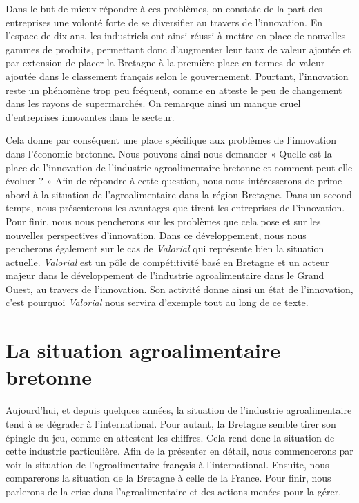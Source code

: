 \documentclass[a4paper,12pt]{report}
\begin{document}
	 Dans le but de mieux répondre à ces problèmes, on constate de la part des entreprises une volonté forte de se diversifier au travers de l’innovation. En l’espace de dix ans, les industriels ont ainsi réussi à mettre en place de nouvelles gammes de produits, permettant donc d’augmenter leur taux de valeur ajoutée et par extension de placer la Bretagne à la première place en termes de valeur ajoutée dans le classement français selon le gouvernement. Pourtant, l'innovation reste un phénomène trop peu fréquent, comme en atteste le peu de changement dans les rayons de supermarchés. On remarque ainsi un manque cruel d'entreprises innovantes dans le secteur.
	 
	 Cela donne par conséquent une place spécifique aux problèmes de l'innovation dans l’économie bretonne. Nous pouvons ainsi nous demander « Quelle est la place de l'innovation de l'industrie agroalimentaire bretonne et comment peut-elle évoluer ? » Afin de répondre à cette question, nous nous intéresserons de prime abord à la situation de l’agroalimentaire dans la région Bretagne. Dans un second temps, nous présenterons les avantages que tirent les entreprises de l'innovation. Pour finir, nous nous pencherons sur les problèmes que cela pose et sur les nouvelles perspectives d'innovation. Dans ce développement, nous nous pencherons également sur le cas de \textit{Valorial} qui représente bien la situation actuelle. \textit{Valorial} est un pôle de compétitivité basé en Bretagne et un acteur majeur dans le développement de l'industrie agroalimentaire dans le Grand Ouest, au travers de l'innovation. Son activité donne ainsi un état de l'innovation, c'est pourquoi \textit{Valorial} nous servira d'exemple tout au long de ce texte.
	 
\chapter{La situation agroalimentaire bretonne}
	Aujourd’hui, et depuis quelques années, la situation de l’industrie agroalimentaire tend à se dégrader à l’international. Pour autant, la Bretagne semble tirer son épingle du jeu, comme en attestent les chiffres. Cela rend donc la situation de cette industrie particulière. Afin de la présenter en détail, nous commencerons par voir la situation de l’agroalimentaire français à l’international. Ensuite, nous comparerons la situation de la Bretagne à celle de la France. Pour finir, nous parlerons de la crise dans l’agroalimentaire et des actions menées pour la gérer.
\end{document}

